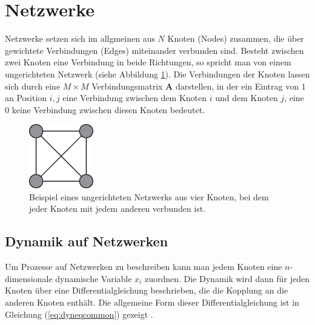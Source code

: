 
\section{Netzwerke}
Netzwerke setzen sich im allgmeinen aus $N$ Knoten (Nodes) zusammen, die über gewichtete Verbindungen (Edges) miteinander verbunden sind. Besteht zwischen zwei Knoten eine Verbindung in beide Richtungen, so spricht man von einem ungerichteten Netzwerk (siehe Abbildung \ref{fig:GraphBsp}). Die Verbindungen der Knoten lassen sich durch eine $M\times M$ Verbindungsmatrix $\boldsymbol{A}$ darstellen, in der ein Eintrag von $1$ an Position $i,j$ eine Verbindung zwischen dem Knoten $i$ und dem Knoten $j$, eine $0$ keine Verbindung zwischen diesen Knoten bedeutet.

\begin{figure}[t]
	 \centering
	\includegraphics[width=0.25\textwidth]{abb/misc/GraphBsp.eps}
	\caption[Ungerichteres Netzwerk]{Beispiel eines ungerichteten Netzwerks aus vier Knoten, bei dem jeder Knoten mit jedem anderen verbunden ist.}
	\label{fig:GraphBsp}
\end{figure}


\subsection*{Dynamik auf Netzwerken}
Um Prozesse auf Netzwerken zu beschreiben kann man jedem Knoten eine $n$-dimensionale dynamische Variable $x_i$ zuordnen. Die Dynamik wird dann für jeden Knoten über eine Differentialgleichung beschrieben, die die Kopplung an die anderen Knoten enthält. Die allgemeine Form dieser Differentialgleichung ist in Gleichung (\ref*{eq:dyneqcommon}) gezeigt \citep{pecora1998}.


